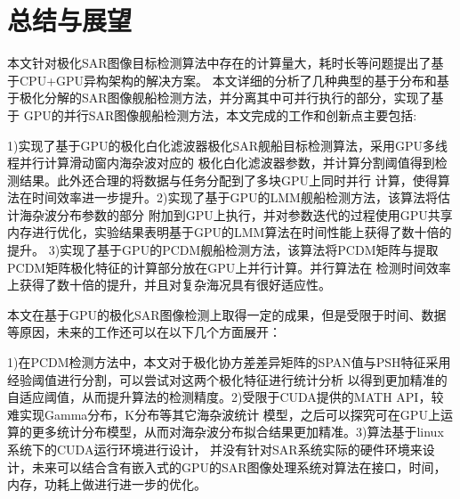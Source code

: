 \chapter{总结与展望}
本文针对极化SAR图像目标检测算法中存在的计算量大，耗时长等问题提出了基于CPU+GPU异构架构的解决方案。
本文详细的分析了几种典型的基于分布和基于极化分解的SAR图像舰船检测方法，并分离其中可并行执行的部分，实现了基于
GPU的并行SAR图像舰船检测方法，本文完成的工作和创新点主要包括:

1)实现了基于GPU的极化白化滤波器极化SAR舰船目标检测算法，采用GPU多线程并行计算滑动窗内海杂波对应的
极化白化滤波器参数，并计算分割阈值得到检测结果。此外还合理的将数据与任务分配到了多块GPU上同时并行
计算，使得算法在时间效率进一步提升。2)实现了基于GPU的LMM舰船检测方法，该算法将估计海杂波分布参数的部分
附加到GPU上执行，并对参数迭代的过程使用GPU共享内存进行优化，实验结果表明基于GPU的LMM算法在时间性能上获得了数十倍的提升。
3)实现了基于GPU的PCDM舰船检测方法，该算法将PCDM矩阵与提取PCDM矩阵极化特征的计算部分放在GPU上并行计算。并行算法在
检测时间效率上获得了数十倍的提升，并且对复杂海况具有很好适应性。

本文在基于GPU的极化SAR图像检测上取得一定的成果，但是受限于时间、数据等原因，未来的工作还可以在以下几个方面展开：

1)在PCDM检测方法中，本文对于极化协方差差异矩阵的SPAN值与PSH特征采用经验阈值进行分割，可以尝试对这两个极化特征进行统计分析
以得到更加精准的自适应阈值，从而提升算法的检测精度。2)受限于CUDA提供的MATH API，较难实现Gamma分布，K分布等其它海杂波统计
模型，之后可以探究可在GPU上运算的更多统计分布模型，从而对海杂波分布拟合结果更加精准。3)算法基于linux系统下的CUDA运行环境进行设计，
并没有针对SAR系统实际的硬件环境来设计，未来可以结合含有嵌入式的GPU的SAR图像处理系统对算法在接口，时间，内存，功耗上做进行进一步的优化。

